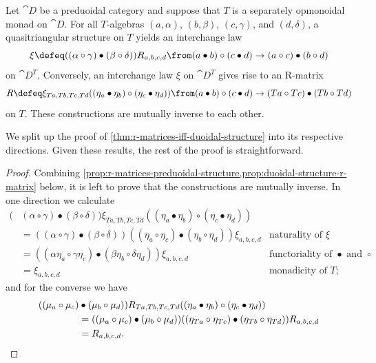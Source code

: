 \begin{theorem}\label{thm:r-matrices-iff-duoidal-structure}
  Let \(\cat{D}\) be a preduoidal category and suppose that
  \(T\) is a separately opmonoidal monad on \(\cat{D}\).
  For all \(T\)\hyp{}algebras \((a, \alpha)\), \((b, \beta)\), \((c, \gamma)\), and \((d, \delta)\),
  a quasitriangular structure on \(T\) yields an interchange law
  \[
    \xi \defeq ((\alpha \circ \gamma) \bullet (\beta \circ \delta)) R_{a,b,c,d} \from (a \bullet b) \circ (c \bullet d) \to (a \circ c) \bullet (b \circ d)
  \]
  on \(\cat{D}^T\).
  Conversely, an interchange law \(\xi\) on \(\cat{D}^T\) gives rise to an R\hyp{}matrix
  \[
    R
    \defeq \xi_{Ta,Tb,Tc,Td} ((\eta_a \bullet \eta_b) \circ (\eta_c \bullet \eta_d))
    \from (a \bullet b) \circ (c \bullet d) \to (Ta \circ Tc) \bullet (Tb \circ Td)
  \]
  on \(T\).
  These constructions are mutually inverse to each other.
\end{theorem}


We split up the proof of \cref{thm:r-matrices-iff-duoidal-structure}
into its respective directions.
Given these results, the rest of the proof is straightforward.

\begin{proof}
  Combining \cref{prop:r-matrices-preduoidal-structure,prop:duoidal-structure-r-matrix} below,
  it is left to prove that the constructions are mutually inverse.
  In one direction we calculate
  \begin{align*}
    (&(\alpha \circ \gamma) \bullet (\beta \circ \delta)) \xi_{Ta,Tb,Tc,Td} ((\eta_a \bullet \eta_b) \circ (\eta_c \bullet \eta_d)) \\
     &= ((\alpha \circ \gamma) \bullet (\beta \circ \delta)) ((\eta_a \circ \eta_c) \bullet (\eta_b \circ \eta_d)) \xi_{a,b,c,d} &\text{naturality of } \xi \\
     &= ((\alpha\eta_a \circ \gamma\eta_c) \bullet (\beta\eta_b \circ \delta\eta_d)) \xi_{a,b,c,d} &\text{functoriality of } \bullet \text{ and } \circ \\
     &= \xi_{a,b,c,d} &\text{monadicity of } T;
  \end{align*}
  and for the converse we have
  \begin{align*}
    ((\mu_a \circ \mu_c)& \bullet (\mu_b \circ \mu_d)) R_{Ta,Tb,Tc,Td} ((\eta_a \bullet \eta_b) \circ (\eta_c \bullet \eta_d)) \\
                &= ((\mu_a \circ \mu_c) \bullet (\mu_b \circ \mu_d)) ((\eta_{Ta} \circ \eta_{Tc}) \bullet (\eta_{Tb} \circ \eta_{Td})) R_{a,b,c,d} \\
                &= R_{a,b,c,d}.\qedhere
  \end{align*}
\end{proof}

